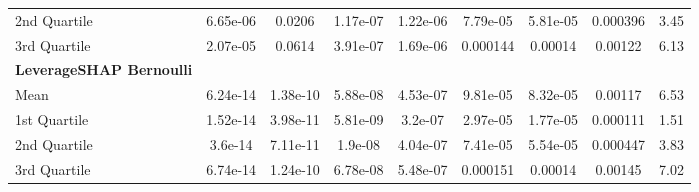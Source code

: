 {\begin{tabular} {lcccccccc}
\hspace{7pt}2nd Quartile & \cellcolor{bronze!60}6.65e-06 & \cellcolor{bronze!60}0.0206 & \cellcolor{bronze!60}1.17e-07 & 1.22e-06 & \cellcolor{silver!60}7.79e-05 & \cellcolor{silver!60}5.81e-05 & \cellcolor{gold!60}0.000396 & \cellcolor{gold!60}3.45 \\ 
\hspace{7pt}3rd Quartile & \cellcolor{bronze!60}2.07e-05 & \cellcolor{bronze!60}0.0614 & \cellcolor{silver!60}3.91e-07 & 1.69e-06 & \cellcolor{gold!60}0.000144 & \cellcolor{silver!60}0.00014 & \cellcolor{gold!60}0.00122 & \cellcolor{gold!60}6.13 \\ 
\addlinespace[1ex] 
\textbf{LeverageSHAP Bernoulli} &  &  &  &  &  &  &  &  \\ 
\hspace{7pt}Mean & \cellcolor{silver!60}6.24e-14 & \cellcolor{gold!60}1.38e-10 & \cellcolor{gold!60}5.88e-08 & \cellcolor{silver!60}4.53e-07 & \cellcolor{gold!60}9.81e-05 & \cellcolor{gold!60}8.32e-05 & \cellcolor{silver!60}0.00117 & \cellcolor{silver!60}6.53 \\ 
\hspace{7pt}1st Quartile & \cellcolor{silver!60}1.52e-14 & \cellcolor{silver!60}3.98e-11 & \cellcolor{gold!60}5.81e-09 & \cellcolor{silver!60}3.2e-07 & \cellcolor{gold!60}2.97e-05 & \cellcolor{gold!60}1.77e-05 & \cellcolor{silver!60}0.000111 & \cellcolor{silver!60}1.51 \\ 
\hspace{7pt}2nd Quartile & \cellcolor{silver!60}3.6e-14 & \cellcolor{silver!60}7.11e-11 & \cellcolor{gold!60}1.9e-08 & \cellcolor{gold!60}4.04e-07 & \cellcolor{gold!60}7.41e-05 & \cellcolor{gold!60}5.54e-05 & \cellcolor{silver!60}0.000447 & \cellcolor{silver!60}3.83 \\ 
\hspace{7pt}3rd Quartile & \cellcolor{silver!60}6.74e-14 & \cellcolor{gold!60}1.24e-10 & \cellcolor{gold!60}6.78e-08 & \cellcolor{silver!60}5.48e-07 & \cellcolor{silver!60}0.000151 & \cellcolor{gold!60}0.00014 & \cellcolor{silver!60}0.00145 & \cellcolor{silver!60}7.02 \\ 
\bottomrule
\end{tabular}}